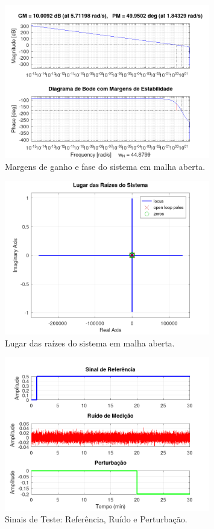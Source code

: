 \documentclass[a4paper,12pt]{article}
\begin{document}
\begin{figure}[H]
    \centering
    \includegraphics[width=0.8\textwidth]{figura_margens_estabilidade.png}
    \caption{Margens de ganho e fase do sistema em malha aberta.}
    \label{fig:margens_main}
\end{figure}

\begin{figure}[H]
    \centering
    \includegraphics[width=0.8\textwidth]{figura_lugar_raizes.png}
    \caption{Lugar das raízes do sistema em malha aberta.}
    \label{fig:lr_main}
\end{figure}

\begin{figure}[H]
    \centering
    \includegraphics[width=0.8\textwidth]{figura_sinais_teste.png}
    \caption{Sinais de Teste: Referência, Ruído e Perturbação.}
    \label{fig:sinais_teste_main}
\end{figure}
\end{document}
